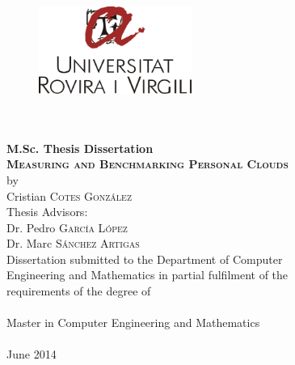 \begin{titlepage}
\begin{center}
\begin{figure}
	\begin{center}
		\includegraphics[width=5cm]{figures/urv-logo.png}
	\end{center}
\end{figure}
\vspace*{0.3cm}
 \\
\vspace*{0.1cm}
 \\
\vspace*{0.6cm}
\noindent \Huge \textbf{M.Sc. Thesis Dissertation} \\
\vspace*{0.6cm}
\vspace*{0.3cm}
\noindent \Large \textbf{\textsc{Measuring and Benchmarking Personal Clouds}}\\
\vspace*{0.4cm}
\noindent \large {by\\}
\noindent \LARGE Cristian \textsc{Cotes Gonz{\'a}lez} \\
\vspace*{1.3cm}
\noindent \Large {Thesis Advisors:} \\
\noindent \Large Dr. Pedro \textsc{Garc{\'i}a L{\'o}pez}\\
\noindent \Large Dr. Marc \textsc{S{\'a}nchez Artigas}\\
\vspace*{2.0cm}
\noindent \large Dissertation submitted to the Department of Computer \\
\noindent \large Engineering and Mathematics in partial fulfilment of the  \\
\noindent \large requirements of the degree of \\[0.5cm]
\noindent \large \\ Master in Computer Engineering and Mathematics
\\[1cm]
\noindent \large \\ June 2014
\vspace*{0.5cm}

\end{center}





\end{titlepage}
\sloppy

\titlepage
